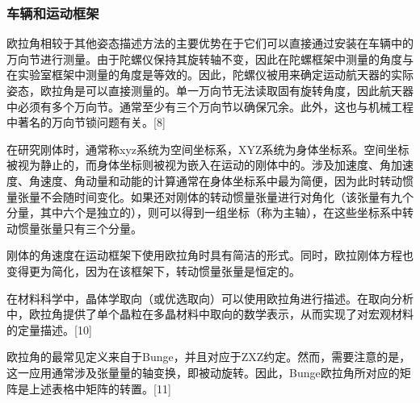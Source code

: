 \subsubsection{车辆和运动框架}
欧拉角相较于其他姿态描述方法的主要优势在于它们可以直接通过安装在车辆中的万向节进行测量。由于陀螺仪保持其旋转轴不变，因此在陀螺框架中测量的角度与在实验室框架中测量的角度是等效的。因此，陀螺仪被用来确定运动航天器的实际姿态，欧拉角是可以直接测量的。单一万向节无法读取固有旋转角度，因此航天器中必须有多个万向节。通常至少有三个万向节以确保冗余。此外，这也与机械工程中著名的万向节锁问题有关。[8]

在研究刚体时，通常称xyz系统为空间坐标系，XYZ系统为身体坐标系。空间坐标被视为静止的，而身体坐标则被视为嵌入在运动的刚体中的。涉及加速度、角加速度、角速度、角动量和动能的计算通常在身体坐标系中最为简便，因为此时转动惯量张量不会随时间变化。如果还对刚体的转动惯量张量进行对角化（该张量有九个分量，其中六个是独立的），则可以得到一组坐标（称为主轴），在这些坐标系中转动惯量张量只有三个分量。

刚体的角速度在运动框架下使用欧拉角时具有简洁的形式。同时，欧拉刚体方程也变得更为简化，因为在该框架下，转动惯量张量是恒定的。


在材料科学中，晶体学取向（或优选取向）可以使用欧拉角进行描述。在取向分析中，欧拉角提供了单个晶粒在多晶材料中取向的数学表示，从而实现了对宏观材料的定量描述。[10]

欧拉角的最常见定义来自于Bunge，并且对应于ZXZ约定。然而，需要注意的是，这一应用通常涉及张量量的轴变换，即被动旋转。因此，Bunge欧拉角所对应的矩阵是上述表格中矩阵的转置。[11]